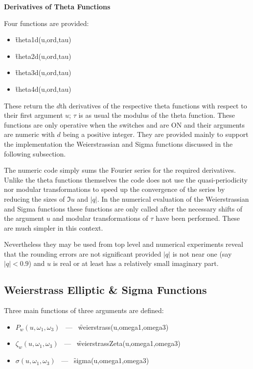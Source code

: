 \textbf{Derivatives of Theta Functions}


\hypertarget{THETAD}{}
 
Four functions are provided:
\begin{itemize}
\item \f{theta1d(u,ord,tau)}
\item \f{theta2d(u,ord,tau)}
\item \f{theta3d(u,ord,tau)}
\item \f{theta4d(u,ord,tau)}
\end{itemize}
These return the $d$th derivatives of the respective theta functions
with respect to their first argument $u$; $\tau$ is as usual the modulus
of the theta function. These functions are only operative when the switches
 and  are ON and their arguments are numeric with
$d$ being a positive integer.  They are provided mainly to support the implementation
the Weierstrassian and Sigma functions discussed in the following subsection.

The numeric code simply sums the Fourier series for the required derivatives.
Unlike the theta functions themselves the code does not use the quasi-periodicity nor
modular transformations to speed  up the convergence of the series by reducing the sizes
of $\Im u$ and $|q|$.  In the numerical evaluation of the Weierstrassian and Sigma functions
these functions are only called after the necessary shifts of the argument $u$ and modular
transformations of $\tau$ have been performed. These are much simpler in this context.

Nevertheless they may be used from top level and numerical experiments reveal that the rounding
errors are not significant provided $|q|$ is not near one (say $|q|<0.9$)
and $u$ is real or at least has a relatively small imaginary part.

\subsection{Weierstrass Elliptic \& Sigma Functions}
Three main functions of three arguments are defined:
\hypertarget{WEIERSTRASS}{}
\hypertarget{WEIERSTRASSZETA}{}
\hypertarget{SIGMA}{}
\hypertarget{operator:sigma}{}
\hypertarget{operator:Weierstrass}{}
\hypertarget{operator:WeierstrassZeta}{}
 
\begin{itemize}
\item  $P_w(u, \omega_1, \omega_3)$ \ --- \ \f{weierstrass(u,omega1,omega3)}
\item $\zeta_w(u, \omega_1, \omega_3)$ \ --- \ \f{weierstrassZeta(u,omega1,omega3)}
\item $\sigma(u, \omega_1, \omega_3)$ \ --- \ \f{sigma(u,omega1,omega3)}
\end{itemize}


